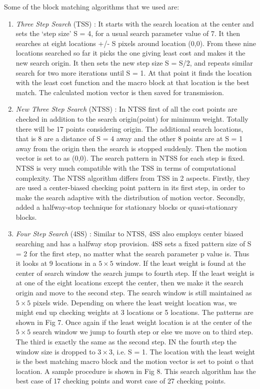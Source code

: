 \documentclass[twocolumn,twoside]{article}
\begin{document}
Some of the block matching algorithms that we used are: 
\begin{enumerate}[i]

\item {\textit {Three Step Search} (TSS) : It starts with the search location at the center and sets the ‘step size’ S = 4, for a usual search parameter value of 7. It then searches at eight locations +/- S pixels around location (0,0). From these nine locations searched so far it picks the one giving least cost and makes it the new search origin. It then sets the new step size S = S/2, and repeats similar search for two more iterations until S = 1. At that point it finds the location with the least cost function and the macro block at that location is the best match. The calculated motion vector is then saved for transmission.}\\

\item {\textit {New Three Step Search} (NTSS) : In NTSS first of all the cost points are checked in addition to the search origin(point) for minimum weight. Totally there will be 17 points considering origin. The additional search locations, that is 8 are a distance of S = 4 away and the other 8 points are at S = 1 away from the origin then the search is stopped suddenly. Then the motion vector is set to as (0,0). The search pattern in NTSS for each step is fixed. NTSS is very much compatible with the TSS in terms of computational complexity. The NTSS algorithm differs from TSS in 2 aspects. Firstly, they are used a center-biased checking point pattern in its first step, in order to make the search adaptive with the distribution of motion vector. Secondly, added a halfway-stop technique for stationary blocks or quasi-stationary blocks.}\\

\item {\textit {Four Step Search} (4SS) : Similar to NTSS, 4SS also employs center biased searching and has a halfway stop provision. 4SS sets a fixed pattern size of S = 2 for the first step, no matter what the search parameter p value is. Thus it looks at 9 locations in a $5\times 5$ window. If the least weight is found at the center of search window the search jumps to fourth step. If the least weight is at one of the eight locations except the center, then we make it the search origin and move to the second step. The search window is still maintained as $5\times 5$ pixels wide. Depending on  where the least weight location was, we might end up checking weights at 3 locations or 5 locations. The patterns are shown in Fig 7. Once again if the least weight location is at the center of the $5\times 5$ search window we jump to fourth step or else we move on to third step. The third is exactly the same as the second step. IN the fourth step the window size is dropped to $3\times 3$, i.e. S = 1. The location with the least weight is the best matching macro block and the motion vector is set to point o that location. A sample procedure is shown in Fig 8. This search algorithm has the best case of 17 checking points and worst case of 27 checking points.}\\


\end{enumerate}
\end{document}
